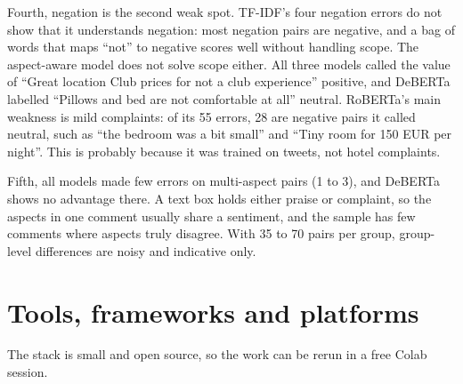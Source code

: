 \documentclass[11pt,a4paper]{article}
\begin{document}
Fourth, negation is the second weak spot. TF-IDF's four negation errors do not show that it understands negation: most negation pairs are negative, and a bag of words that maps ``not'' to negative scores well without handling scope. The aspect-aware model does not solve scope either. All three models called the value of ``Great location Club prices for not a club experience'' positive, and DeBERTa labelled ``Pillows and bed are not comfortable at all'' neutral. RoBERTa's main weakness is mild complaints: of its 55 errors, 28 are negative pairs it called neutral, such as ``the bedroom was a bit small'' and ``Tiny room for 150 EUR per night''. This is probably because it was trained on tweets, not hotel complaints.

Fifth, all models made few errors on multi-aspect pairs (1 to 3), and DeBERTa shows no advantage there. A text box holds either praise or complaint, so the aspects in one comment usually share a sentiment, and the sample has few comments where aspects truly disagree. With 35 to 70 pairs per group, group-level differences are noisy and indicative only.

\section{Tools, frameworks and platforms}\label{sec:tools}

The stack is small and open source, so the work can be rerun in a free Colab session.
\end{document}
